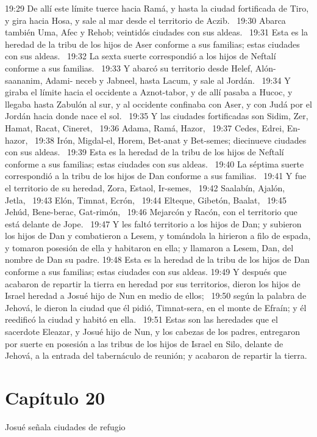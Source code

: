 19:29 De allí este límite tuerce hacia Ramá, y hasta la ciudad fortificada de Tiro, y gira hacia Hosa, y sale al mar desde el territorio de Aczib.  
19:30 Abarca también Uma, Afec y Rehob; veintidós ciudades con sus aldeas.  
19:31 Esta es la heredad de la tribu de los hijos de Aser conforme a sus familias; estas ciudades con sus aldeas.  
19:32 La sexta suerte correspondió a los hijos de Neftalí conforme a sus familias.  
19:33 Y abarcó su territorio desde Helef, Alón-saananim, Adami- neceb y Jabneel, hasta Lacum, y sale al Jordán.  
19:34 Y giraba el límite hacia el occidente a Aznot-tabor, y de allí pasaba a Hucoc, y llegaba hasta Zabulón al sur, y al occidente confinaba con Aser, y con Judá por el Jordán hacia donde nace el sol.  
19:35 Y las ciudades fortificadas son Sidim, Zer, Hamat, Racat, Cineret,  
19:36 Adama, Ramá, Hazor,  
19:37 Cedes, Edrei, En-hazor,  
19:38 Irón, Migdal-el, Horem, Bet-anat y Bet-semes; diecinueve ciudades con sus aldeas.  
19:39 Esta es la heredad de la tribu de los hijos de Neftalí conforme a sus familias; estas ciudades con sus aldeas.  
19:40 La séptima suerte correspondió a la tribu de los hijos de Dan conforme a sus familias.  
19:41 Y fue el territorio de su heredad, Zora, Estaol, Ir-semes,  
19:42 Saalabín, Ajalón, Jetla,  
19:43 Elón, Timnat, Ecrón,  
19:44 Elteque, Gibetón, Baalat,  
19:45 Jehúd, Bene-berac, Gat-rimón,  
19:46 Mejarcón y Racón, con el territorio que está delante de Jope.  
19:47 Y les faltó territorio a los hijos de Dan; y subieron los hijos de Dan y combatieron a Lesem, y tomándola la hirieron a filo de espada, y tomaron posesión de ella y habitaron en ella; y llamaron a Lesem, Dan, del nombre de Dan su padre. 
19:48 Esta es la heredad de la tribu de los hijos de Dan conforme a sus familias; estas ciudades con sus aldeas. 
19:49 Y después que acabaron de repartir la tierra en heredad por sus territorios, dieron los hijos de Israel heredad a Josué hijo de Nun en medio de ellos;  
19:50 según la palabra de Jehová, le dieron la ciudad que él pidió, Timnat-sera, en el monte de Efraín; y él reedificó la ciudad y habitó en ella.  
19:51 Estas son las heredades que el sacerdote Eleazar, y Josué hijo de Nun, y los cabezas de los padres, entregaron por suerte en posesión a las tribus de los hijos de Israel en Silo, delante de Jehová, a la entrada del tabernáculo de reunión; y acabaron de repartir la tierra. 
\section*{Capítulo 20 }
Josué señala ciudades de refugio  

